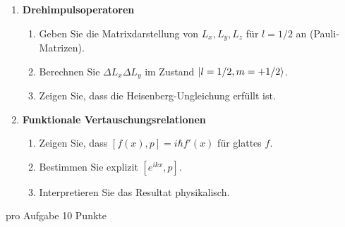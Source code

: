\documentclass[11pt,a4paper]{article}
\begin{document}
\begin{enumerate}
\item \textbf{Drehimpulsoperatoren}\\
\begin{enumerate}
  \item Geben Sie die Matrixdarstellung von $L_x,L_y,L_z$ für $l=1/2$ an (Pauli-Matrizen).
  \item Berechnen Sie $\Delta L_x\Delta L_y$ im Zustand $\ket{l=1/2,m=+1/2}$.
  \item Zeigen Sie, dass die Heisenberg-Ungleichung erfüllt ist.
\end{enumerate}

\item \textbf{Funktionale Vertauschungsrelationen}\\
\begin{enumerate}
  \item Zeigen Sie, dass $[f(x),p]=i\hbar f'(x)$ für glattes $f$.
  \item Bestimmen Sie explizit $[e^{ikx},p]$.
  \item Interpretieren Sie das Resultat physikalisch.
\end{enumerate}

\end{enumerate}



\pagebreak



\noindent pro Aufgabe 10 Punkte
\end{document}
